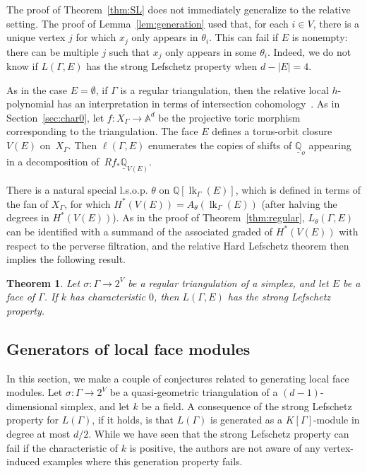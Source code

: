 \documentclass[11pt]{article}
\newtheorem{theo}{Theorem}[section]
\theoremstyle{definition}
\numberwithin{equation}{section}
\numberwithin{equation}{section}
\begin{document}
The proof of Theorem~\ref{thm:SL} does not immediately generalize to the relative setting. The proof of Lemma~\ref{lem:generation} used that, for each $i \in V$, there is a unique vertex $j$ for which $x_j$ only appears in $\theta_i$. This can fail if $E$ is nonempty: there can be multiple $j$ such that $x_j$ only appears in some $\theta_i$. Indeed, we do not know if $L(\Gamma, E)$ has the strong Lefschetz property when $d - |E| = 4$. 

As in the case $E = \emptyset$, if $\Gamma$ is a regular triangulation, then the relative local $h$-polynomial has an interpretation in terms of intersection cohomology~\cite[Theorem 6.1]{KatzStapledon16}. As in Section~\ref{sec:char0}, let $f \colon X_{\Gamma} \to \mathbb{A}^d$ be the projective toric morphism corresponding to the triangulation. The face $E$ defines a torus-orbit closure $V(E)$ on~$X_{\Gamma}$. Then $\ell(\Gamma, E)$ enumerates the copies of shifts of $\underline{\mathbb{Q}}_{o}$ appearing in a decomposition of~$Rf_* \underline{\mathbb{Q}}_{V(E)}$. 

There is a natural special l.s.o.p. $\theta$ on $\mathbb{Q}[\operatorname{lk}_{\Gamma}(E)]$, which is defined in terms of the fan of $X_{\Gamma}$, for which $H^*(V(E)) = A_{\theta}(\operatorname{lk}_{\Gamma}(E))$ (after halving the degrees in $H^*(V(E))$). As in the proof of Theorem~\ref{thm:regular}, $L_{\theta}(\Gamma, E)$ can be identified with a summand of the associated graded of $H^*(V(E))$ with respect to the perverse filtration, and the relative Hard Lefschetz theorem then implies the following result. 


\begin{theo}
Let $\sigma \colon \Gamma \to 2^V$ be a regular triangulation of a simplex, and let $E$ be a face of $\Gamma$. If $k$ has characteristic $0$, then $L(\Gamma, E)$ has the strong Lefschetz property. 
\end{theo}


\subsection{Generators of local face modules}\label{ssec:generation}

In this section, we make a couple of conjectures related to generating local face modules. 
Let $\sigma \colon \Gamma \to 2^V$ be a quasi-geometric triangulation of a $(d-1)$-dimensional simplex, and let $k$ be a field. 
A consequence of the strong Lefschetz property for $L(\Gamma)$, if it holds, is that $L(\Gamma)$ is generated as a $K[\Gamma]$-module in degree at most $d/2$. While we have seen that the strong Lefschetz property can fail if the characteristic of $k$ is positive, the authors are not aware of any vertex-induced examples where this generation property fails. 
\end{document}
